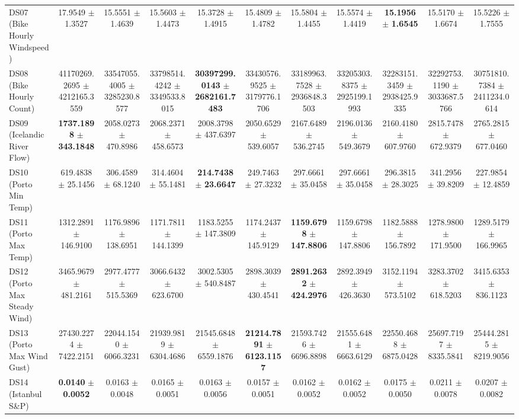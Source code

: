 \begin{table}[t]
{{\begin{tabular}{lcccccccccc}
DS07 (Bike Hourly Windspeed) & 17.9549 $\pm$ 1.3527 & 15.5551 $\pm$ 1.4639 & 15.5603 $\pm$ 1.4473 & 15.3728 $\pm$ 1.4915 & 15.4809 $\pm$ 1.4782 & 15.5804 $\pm$ 1.4455 & 15.5574 $\pm$ 1.4419 & \textbf{15.1956} $\pm$ \textbf{1.6545} & 15.5170 $\pm$ 1.6674 & 15.5226 $\pm$ 1.7555 \\
DS08 (Bike Hourly Count) & 41170269.2695 $\pm$ 4212165.3559 & 33547055.4005 $\pm$ 3285230.8577 & 33798514.4242 $\pm$ 3349533.8015 & \textbf{30397299.0143} $\pm$ \textbf{2682161.7483} & 33430576.9525 $\pm$ 3179776.1706 & 33189963.7528 $\pm$ 2936848.3503 & 33205303.8375 $\pm$ 2925199.1993 & 32283151.3459 $\pm$ 2938425.9335 & 32292753.1190 $\pm$ 3033687.5766 & 30751810.7384 $\pm$ 2411234.0614 \\
DS09 (Icelandic River Flow) & \textbf{1737.1898} $\pm$ \textbf{343.1848} & 2058.0273 $\pm$ 470.8986 & 2068.2371 $\pm$ 458.6573 & 2008.3798 $\pm$ 437.6397 & 2050.6529 $\pm$ 539.6057 & 2167.6489 $\pm$ 536.2745 & 2196.0136 $\pm$ 549.3679 & 2160.4180 $\pm$ 607.9760 & 2815.7478 $\pm$ 672.9379 & 2765.2815 $\pm$ 677.0460 \\
DS10 (Porto Min Temp) & 619.4838 $\pm$ 25.1456 & 306.4589 $\pm$ 68.1240 & 314.4604 $\pm$ 55.1481 & \textbf{214.7438} $\pm$ \textbf{23.6647} & 249.7463 $\pm$ 27.3232 & 297.6661 $\pm$ 35.0458 & 297.6661 $\pm$ 35.0458 & 296.3815 $\pm$ 28.3025 & 341.2956 $\pm$ 39.8209 & 227.9854 $\pm$ 12.4859 \\
DS11 (Porto Max Temp) & 1312.2891 $\pm$ 146.9100 & 1176.9896 $\pm$ 138.6951 & 1171.7811 $\pm$ 144.1399 & 1183.5255 $\pm$ 147.3809 & 1174.2437 $\pm$ 145.9129 & \textbf{1159.6798} $\pm$ \textbf{147.8806} & 1159.6798 $\pm$ 147.8806 & 1182.5888 $\pm$ 156.7892 & 1278.9800 $\pm$ 171.9500 & 1289.5179 $\pm$ 166.9965 \\
DS12 (Porto Max Steady Wind) & 3465.9679 $\pm$ 481.2161 & 2977.4777 $\pm$ 515.5369 & 3066.6432 $\pm$ 623.6700 & 3002.5305 $\pm$ 540.8487 & 2898.3039 $\pm$ 430.4541 & \textbf{2891.2632} $\pm$ \textbf{424.2976} & 2892.3949 $\pm$ 426.3630 & 3152.1194 $\pm$ 573.5102 & 3283.3702 $\pm$ 618.5203 & 3415.6353 $\pm$ 836.1123 \\
DS13 (Porto Max Wind Gust) & 27430.2274 $\pm$ 7422.2151 & 22044.1540 $\pm$ 6066.3231 & 21939.9819 $\pm$ 6304.4686 & 21545.6848 $\pm$ 6559.1876 & \textbf{21214.7891} $\pm$ \textbf{6123.1157} & 21593.7426 $\pm$ 6696.8898 & 21555.6481 $\pm$ 6663.6129 & 22550.4688 $\pm$ 6875.0428 & 25697.7197 $\pm$ 8335.5841 & 25444.2815 $\pm$ 8219.9056 \\
DS14 (Istanbul S\&P) & \textbf{0.0140} $\pm$ \textbf{0.0052} & 0.0163 $\pm$ 0.0048 & 0.0165 $\pm$ 0.0051 & 0.0163 $\pm$ 0.0056 & 0.0157 $\pm$ 0.0051 & 0.0162 $\pm$ 0.0052 & 0.0162 $\pm$ 0.0052 & 0.0175 $\pm$ 0.0050 & 0.0211 $\pm$ 0.0078 & 0.0207 $\pm$ 0.0082 \\

\end{tabular}}}
\end{table}
